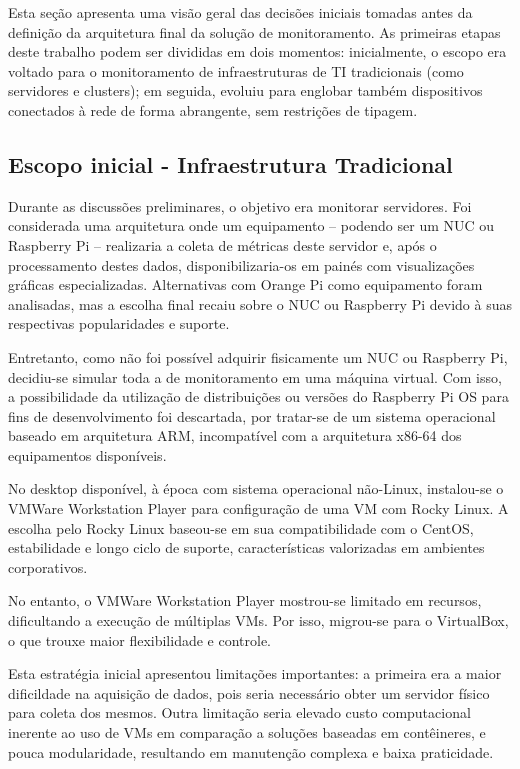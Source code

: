 {Esta seção apresenta uma visão geral das decisões iniciais tomadas antes da definição da arquitetura final da solução de monitoramento. As primeiras etapas deste trabalho podem ser divididas em dois momentos: inicialmente, o escopo era voltado para o monitoramento de infraestruturas de TI tradicionais (como servidores e clusters); em seguida, evoluiu para englobar também dispositivos conectados à rede de forma abrangente, sem restrições de tipagem.

\subsection{Escopo inicial - Infraestrutura Tradicional}
\label{subsection:EscopoInicial}

Durante as discussões preliminares, o objetivo era monitorar servidores. Foi considerada uma arquitetura onde um equipamento -- podendo ser um NUC ou Raspberry Pi -- realizaria a coleta de métricas deste servidor e, após o processamento destes dados, disponibilizaria-os em painés com visualizações gráficas especializadas. Alternativas com Orange Pi como equipamento foram analisadas, mas a escolha final recaiu sobre o NUC ou Raspberry Pi devido à suas respectivas popularidades e suporte.

Entretanto, como não foi possível adquirir fisicamente um NUC ou Raspberry Pi, decidiu-se simular toda a  de monitoramento em uma máquina virtual. Com isso, a possibilidade da utilização de distribuições ou versões do Raspberry Pi OS para fins de desenvolvimento foi descartada, por tratar-se de um sistema operacional baseado em arquitetura ARM, incompatível com a arquitetura x86-64 dos equipamentos disponíveis.

No desktop disponível, à época com sistema operacional não-Linux, instalou-se o VMWare Workstation Player para configuração de uma VM com Rocky Linux. A escolha pelo Rocky Linux baseou-se em sua compatibilidade com o CentOS, estabilidade e longo ciclo de suporte, características valorizadas em ambientes corporativos.

No entanto, o VMWare Workstation Player mostrou-se limitado em recursos, dificultando a execução de múltiplas VMs. Por isso, migrou-se para o VirtualBox, o que trouxe maior flexibilidade e controle.

Esta estratégia inicial apresentou limitações importantes: a primeira era a maior dificildade na aquisição de dados, pois seria necessário obter um servidor físico para coleta dos mesmos. Outra limitação seria elevado custo computacional inerente ao uso de VMs em comparação a soluções baseadas em contêineres, e pouca modularidade, resultando em manutenção complexa e baixa praticidade.

}
